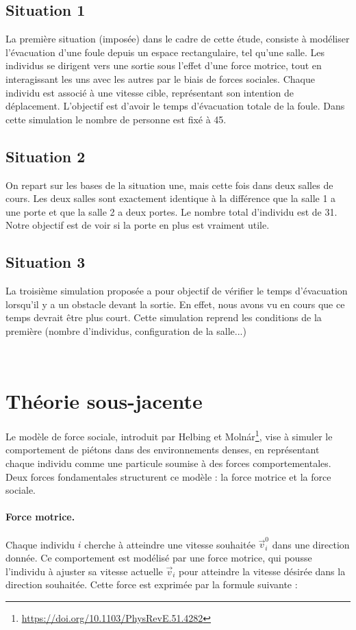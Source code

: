 \documentclass[a4paper,12pt]{article}
\begin{document}
\subsection{Situation 1}
\indent La première situation (imposée) dans le cadre de cette étude, consiste à modéliser l’évacuation d’une foule depuis un espace rectangulaire, tel qu’une salle. Les individus se dirigent vers une sortie sous l'effet d'une force motrice, tout en interagissant les uns avec les autres par le biais de forces sociales. Chaque individu est associé à une vitesse cible, représentant son intention de déplacement. L'objectif est d'avoir le temps d'évacuation totale de la foule. Dans cette simulation le nombre de personne est fixé à 45.

\subsection{Situation 2}
\indent On repart sur les bases de la situation une, mais cette fois dans deux salles de cours. Les deux salles sont exactement identique à la différence que la salle 1 a une porte et que la salle 2 a deux portes. Le nombre total d'individu est de 31. Notre objectif est de voir si la porte en plus est vraiment utile.

\subsection{Situation 3}
\indent La troisième simulation proposée a pour objectif de vérifier le temps d'évacuation lorsqu'il y a un obstacle devant la sortie. En effet, nous avons vu en cours que ce temps devrait être plus court. Cette simulation reprend les conditions de la première (nombre d'individus, configuration de la salle...) 

\
\section{Théorie sous-jacente}

Le modèle de force sociale, introduit par Helbing et Molnár\footnote{\url{https://doi.org/10.1103/PhysRevE.51.4282}}, vise à simuler le comportement de piétons dans des environnements denses, en représentant chaque individu comme une particule soumise à des forces comportementales. Deux forces fondamentales structurent ce modèle : la force motrice et la force sociale.

\paragraph{Force motrice.}
Chaque individu $i$ cherche à atteindre une vitesse souhaitée $\vec{v}_i^0$ dans une direction donnée. Ce comportement est modélisé par une force motrice, qui pousse l'individu à ajuster sa vitesse actuelle $\vec{v}_i$ pour atteindre la vitesse désirée dans la direction souhaitée. Cette force est exprimée par la formule suivante :
\end{document}
